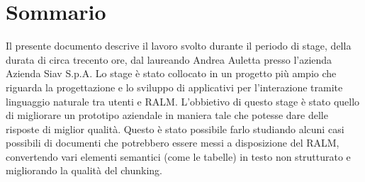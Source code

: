 \cleardoublepage
{}
{}
\begingroup
\let\clearpage\relax
\let\cleardoublepage\relax
\let\cleardoublepage\relax

\chapter*{Sommario}

Il presente documento descrive il lavoro svolto durante il periodo di stage, della durata di circa trecento ore, dal laureando Andrea Auletta presso l'azienda Azienda Siav S.p.A.
Lo stage è stato collocato in un progetto più ampio che riguarda la progettazione e lo sviluppo di applicativi per l'interazione tramite linguaggio naturale
tra utenti e \gls{RALM}.
L'obbietivo di questo stage è stato quello di migliorare un prototipo aziendale in maniera tale che potesse dare delle risposte di miglior qualità.
Questo è stato possibile farlo studiando alcuni casi possibili di documenti che potrebbero essere messi a disposizione del RALM, convertendo vari elementi semantici (come le tabelle) in testo non strutturato e migliorando la qualità del chunking.




\endgroup

\vfill
